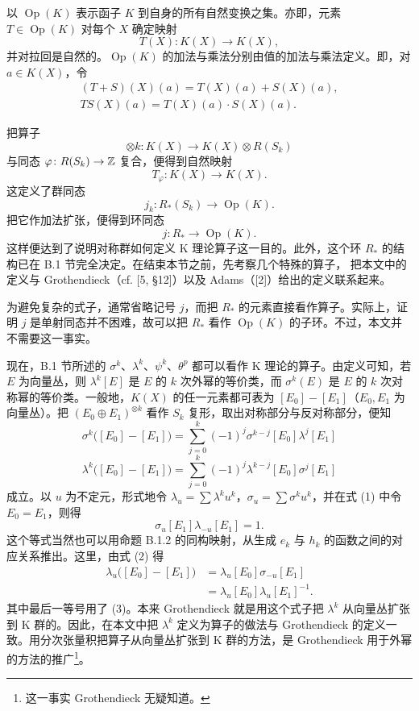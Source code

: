 以 $\operatorname{Op}(K)$ 表示函子 $K$ 到自身的所有自然变换之集。亦即，元素 $T\in\operatorname{Op}(K)$ 对每个 $X$ 确定映射
\[
T(X)\colon K(X)\longrightarrow K(X),
\]
并对拉回是自然的。$\operatorname{Op}(K)$ 的加法与乘法分别由值的加法与乘法定义。即，对 $a\in K(X)$，令
\begin{gather*}
(T+S)(X)(a)=T(X)(a)+S(X)(a),\\
TS(X)(a)=T(X)(a)\cdot S(X)(a).
\end{gather*}

把算子
\[
\otimes k\colon K(X)\longrightarrow K(X)\otimes R(S_k)
\]
与同态 $\varphi\colon R(S_k)\to\mathbb{Z}$ 复合，便得到自然映射
\[
T_\varphi\colon K(X)\longrightarrow K(X).
\]
这定义了群同态
\[
j_k\colon R_*(S_k)\longrightarrow\operatorname{Op}(K).
\]
把它作加法扩张，便得到环同态
\[
j\colon R_*\longrightarrow\operatorname{Op}(K).
\]
这样便达到了说明对称群如何定义 K 理论算子这一目的。此外，这个环 $R_*$ 的结构已在 B.1 节完全决定。在结束本节之前，先考察几个特殊的算子，
把本文中的定义与 Grothendieck（cf. [5, §12]）以及 Adams（[2]）给出的定义联系起来。

为避免复杂的式子，通常省略记号 $j$，而把 $R_*$ 的元素直接看作算子。实际上，证明 $j$ 是单射同态并不困难，故可以把 $R_*$ 看作 $\operatorname{Op}(K)$ 的子环。不过，本文并不需要这一事实。

现在，B.1 节所述的 $\sigma^k$、$\lambda^k$、$\psi^k$、$\theta^p$ 都可以看作 K 理论的算子。由定义可知，若 $E$ 为向量丛，则 $\lambda^k[E]$ 是 $E$ 的 $k$ 次外幂的等价类，而 $\sigma^k(E)$ 是 $E$ 的 $k$ 次对称幂的等价类。一般地，$K(X)$ 的任一元素都可表为 $[E_0]-[E_1]$（$E_0,E_1$ 为向量丛）。把 $(E_0\oplus E_1)^{\otimes k}$ 看作 $S_k$ 复形，取出对称部分与反对称部分，便知
\begin{equation}
\sigma^k\bigl([E_0]-[E_1]\bigr)=\sum_{j=0}^{k}(-1)^j\sigma^{k-j}[E_0]\lambda^j[E_1] \tag{1}
\end{equation}
\begin{equation}
\lambda^k\bigl([E_0]-[E_1]\bigr)=\sum_{j=0}^{k}(-1)^j\lambda^{k-j}[E_0]\sigma^j[E_1] \tag{2}
\end{equation}
成立。以 $u$ 为不定元，形式地令 $\lambda_u=\sum\lambda^ku^k$，$\sigma_u=\sum\sigma^ku^k$，并在式 (1) 中令 $E_0=E_1$，则得
\begin{equation}
\sigma_u[E_1]\lambda_{-u}[E_1]=1. \tag{3}
\end{equation}
这个等式当然也可以用命题 B.1.2 的同构映射，从生成 $e_k$ 与 $h_k$ 的函数之间的对应关系推出。这里，由式 (2) 得
\begin{align*}
\lambda_u\bigl([E_0]-[E_1]\bigr)&=\lambda_u[E_0]\sigma_{-u}[E_1]\\
&=\lambda_u[E_0]\lambda_u[E_1]^{-1}.
\end{align*}
其中最后一等号用了 (3)。本来 Grothendieck 就是用这个式子把 $\lambda^k$ 从向量丛扩张到 K 群的。因此，在本文中把 $\lambda^k$ 定义为算子的做法与 Grothendieck 的定义一致。用分次张量积把算子从向量丛扩张到 K 群的方法，是 Grothendieck
用于外幂的方法的推广\footnote{这一事实 Grothendieck 无疑知道。}。

